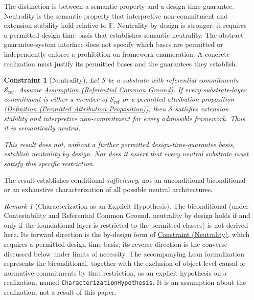 \documentclass[11pt]{article}
\theoremstyle{plain}
\newtheorem{constraint}[theorem]{Constraint}
\theoremstyle{definition}
\theoremstyle{remark}
\newtheorem{remark}[theorem]{Remark}
\newcommand{\DefRef}[2]{\hyperref[#1]{Definition (#2)}}
\newcommand{\AssumpRef}[2]{\hyperref[#1]{Assumption (#2)}}
\newcommand{\ConstRef}[2]{\hyperref[#1]{Constraint (#2)}}
\newcommand{\Substrate}{\mathcal{S}}
\newcommand{\SubstrateRef}{\mathcal{S}_{\mathrm{ref}}}
\newcommand{\Frameworks}{\mathbb{F}}
\begin{document}
The distinction is between a semantic property and a design-time guarantee.
Neutrality is the semantic property that interpretive non-commitment and
extension stability hold relative to $\Frameworks$.
Neutrality by design is stronger:
it requires a permitted design-time basis that establishes semantic neutrality.
The abstract guarantee-system interface does not specify which bases
are permitted or independently enforce a prohibition on framework enumeration.
A concrete realization must justify its permitted bases and
the guarantees they establish.

\begin{constraint}[Neutrality]
  \label{se100.constraint.Neutrality}
  Let $\Substrate$ be a substrate with referential commitments
  $\SubstrateRef$.
  Assume
  \AssumpRef{se100.assump.ReferentialCommonGround}{Referential Common Ground}.
  If every substrate-layer commitment is either a member of
  $\SubstrateRef$ or a permitted attribution proposition
  (\DefRef{se100.def.PermittedAttributionProposition}
  {Permitted Attribution Proposition}),
  then $\Substrate$ satisfies extension stability and
  interpretive non-commitment for every admissible framework.
  Thus it is semantically neutral.

  This result does not, without a further permitted
  design-time-guarantee basis, establish neutrality by design.
  Nor does it assert that every neutral substrate must satisfy
  this specific restriction.
\end{constraint}

The result establishes conditional \emph{sufficiency}, not an
unconditional biconditional or an exhaustive characterization of all
possible neutral architectures.

\begin{remark}[Characterization as an Explicit Hypothesis]
  \label{se100.remark.CharacterizationHypothesis}
  The biconditional (under Contestability and Referential Common
  Ground, neutrality by design holds if and only if the foundational
  layer is restricted to the permitted classes) is not derived here.
  Its forward direction is the by-design form of
  \ConstRef{se100.constraint.Neutrality}{Neutrality}, which requires a
  permitted design-time basis; its reverse direction is the converse
  discussed below under limits of necessity.
  The accompanying Lean formalization represents the biconditional,
  together with the exclusion of object-level causal or normative
  commitments by that restriction, as an explicit hypothesis on a
  realization, named \texttt{CharacterizationHypothesis}.
  It is an assumption about the realization, not a result of this paper.
\end{remark}
\end{document}
